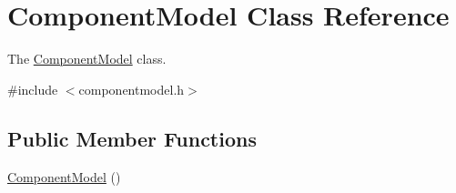 \hypertarget{class_component_model}{}\section{Component\+Model Class Reference}
\label{class_component_model}


The \hyperlink{class_component_model}{Component\+Model} class.  




{\ttfamily \#include $<$componentmodel.\+h$>$}

\subsection*{Public Member Functions}
\begin{DoxyCompactItemize}
\item 
\hyperlink{class_component_model_a8df1c9db45b776c8447300b6ff1845ac}{Component\+Model} ()\hypertarget{class_component_model_a8df1c9db45b776c8447300b6ff1845ac}{}\label{class_component_model_a8df1c9db45b776c8447300b6ff1845ac}


\end{DoxyCompactItemize}
